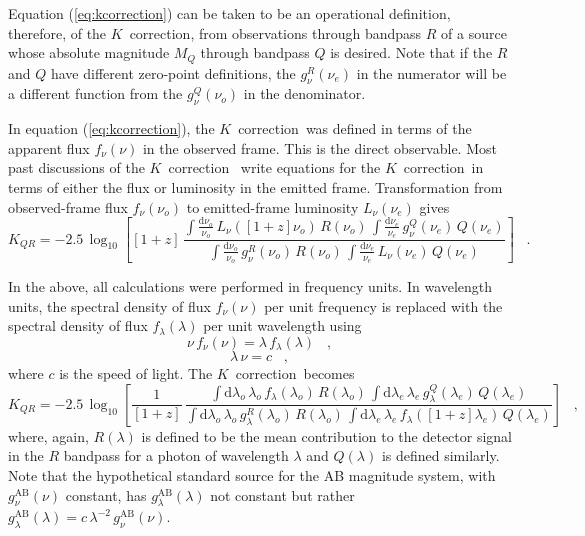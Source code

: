 \documentclass[preprint]{aastex}
\newcommand{\kcorrection}{$K$~correction}
\newcommand{\nuobs}{\nu_o}
\newcommand{\nuemit}{\nu_e}
\newcommand{\lambdaobs}{\lambda_o}
\newcommand{\lambdaemit}{\lambda_e}
\newcommand{\latin}[1]{\textsl{#1}}
\providecommand{\eg}{\latin{e.g.}}
\begin{document}
Equation (\ref{eq:kcorrection}) can be taken to be an operational
definition, therefore, of the \kcorrection, from observations through
bandpass $R$ of a source whose absolute magnitude $M_Q$ through
bandpass $Q$ is desired.  Note that if the $R$ and $Q$ have different
zero-point definitions, the $g^R_{\nu}(\nuemit)$ in the numerator will
be a different function from the $g^Q_{\nu}(\nuobs)$ in the
denominator.

In equation (\ref{eq:kcorrection}), the \kcorrection\ was defined in
terms of the apparent flux $f_{\nu}(\nu)$ in the observed frame.  This
is the direct observable.  Most past discussions of the \kcorrection\
\citep[\eg,][]{oke68a, kim96a} write equations for the \kcorrection\ in
terms of either the flux or luminosity in the emitted frame.
Transformation from observed-frame flux $f_{\nu}(\nuobs)$ to
emitted-frame luminosity $L_{\nu}(\nuemit)$ gives
\begin{equation}
\label{eq:kcorrectionL}
K_{QR} = -2.5\,\log_{10}\left[[1+z]\,
  \frac{\displaystyle
          \int\frac{\mathrm{d}\nuobs}{\nuobs}\,L_{\nu}([1+z]\nuobs)\,R(\nuobs)\,
          \int\frac{\mathrm{d}\nuemit}{\nuemit}\,g^Q_{\nu}(\nuemit)\,Q(\nuemit)}
       {\displaystyle
          \int\frac{\mathrm{d}\nuobs}{\nuobs}\,g^R_{\nu}(\nuobs)\,R(\nuobs)\,
          \int\frac{\mathrm{d}\nuemit}{\nuemit}\,
            L_{\nu}(\nuemit)\,Q(\nuemit)}
\right] \;\;\;.
\end{equation}

In the above, all calculations were performed in frequency units.  In
wavelength units, the spectral density of flux $f_{\nu}(\nu)$ per unit
frequency is replaced with the spectral density of flux
$f_{\lambda}(\lambda)$ per unit wavelength using
\begin{equation}
\nu\,f_{\nu}(\nu) = \lambda\,f_{\lambda}(\lambda) \;\;\;,
\end{equation}
\begin{equation}
\lambda\,\nu = c \;\;\;,
\end{equation}
where $c$ is the speed of light.  The \kcorrection\ becomes
\begin{equation}
\label{eq:wavelength}
K_{QR} = -2.5\,\log_{10}\left[\frac{1}{[1+z]}\,
  \frac{\displaystyle
  \int\mathrm{d}\lambdaobs\,\lambdaobs\,f_{\lambda}(\lambdaobs)\,R(\lambdaobs)\,
    \int\mathrm{d}\lambdaemit\,\lambdaemit\,
    g^Q_{\lambda}(\lambdaemit)\,Q(\lambdaemit)}
       {\displaystyle
  \int\mathrm{d}\lambdaobs\,\lambdaobs\,g^R_{\lambda}(\lambdaobs)\,R(\lambdaobs)\,
    \int\mathrm{d}\lambdaemit\,\lambdaemit\,
    f_{\lambda}([1+z]\lambdaemit)\,Q(\lambdaemit)}
\right] \;\;\;,
\end{equation}
where, again, $R(\lambda)$ is defined to be the mean contribution to
the detector signal in the $R$ bandpass for a photon of wavelength
$\lambda$ and $Q(\lambda)$ is defined similarly.  Note that the
hypothetical standard source for the AB magnitude system, with
$g^\mathrm{AB}_{\nu}(\nu)$ constant, has
$g^\mathrm{AB}_{\lambda}(\lambda)$ not constant but rather
$g^\mathrm{AB}_{\lambda}(\lambda)=
c\,\lambda^{-2}\,g^\mathrm{AB}_{\nu}(\nu)$.
\end{document}
